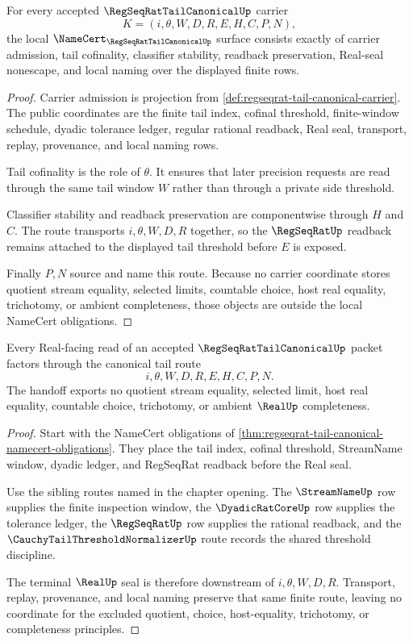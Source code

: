 \begin{theorem}
\label{thm:regseqrat-tail-canonical-namecert-obligations}
For every accepted $\RegSeqRatTailCanonicalUp$ carrier
$$
K=(i,\theta,W,D,R,E,H,C,P,N),
$$
the local $\NameCert_{\RegSeqRatTailCanonicalUp}$ surface consists exactly of carrier admission, tail cofinality, classifier stability, readback preservation, Real-seal nonescape, and local naming over the displayed finite rows.
\end{theorem}
\begin{proof}
Carrier admission is projection from \autoref{def:regseqrat-tail-canonical-carrier}. The public coordinates are the finite tail index, cofinal threshold, finite-window schedule, dyadic tolerance ledger, regular rational readback, Real seal, transport, replay, provenance, and local naming rows.

Tail cofinality is the role of $\theta$. It ensures that later precision requests are read through the same tail window $W$ rather than through a private side threshold.

Classifier stability and readback preservation are componentwise through $H$ and $C$. The route transports $i,\theta,W,D,R$ together, so the $\RegSeqRatUp$ readback remains attached to the displayed tail threshold before $E$ is exposed.

Finally $P,N$ source and name this route. Because no carrier coordinate stores quotient stream equality, selected limits, countable choice, host real equality, trichotomy, or ambient completeness, those objects are outside the local NameCert obligations.
\end{proof}

\begin{theorem}
\label{thm:regseqrat-tail-canonical-real-seal-handoff}
Every Real-facing read of an accepted $\RegSeqRatTailCanonicalUp$ packet factors through the canonical tail route
$$
i,\theta,W,D,R,E,H,C,P,N.
$$
The handoff exports no quotient stream equality, selected limit, host real equality, countable choice, trichotomy, or ambient $\RealUp$ completeness.
\end{theorem}
\begin{proof}
Start with the NameCert obligations of \autoref{thm:regseqrat-tail-canonical-namecert-obligations}. They place the tail index, cofinal threshold, StreamName window, dyadic ledger, and RegSeqRat readback before the Real seal.

Use the sibling routes named in the chapter opening. The $\StreamNameUp$ row supplies the finite inspection window, the $\DyadicRatCoreUp$ row supplies the tolerance ledger, the $\RegSeqRatUp$ row supplies the rational readback, and the $\CauchyTailThresholdNormalizerUp$ route records the shared threshold discipline.

The terminal $\RealUp$ seal is therefore downstream of $i,\theta,W,D,R$. Transport, replay, provenance, and local naming preserve that same finite route, leaving no coordinate for the excluded quotient, choice, host-equality, trichotomy, or completeness principles.
\end{proof}

